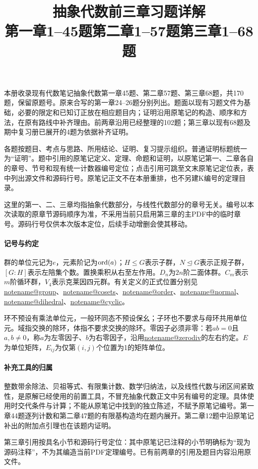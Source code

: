 \documentclass[UTF8,a4paper,11pt,fontset=windows]{ctexart}
\title{抽象代数前三章习题详解\\\large 第一章1--45题\quad 第二章1--57题\quad 第三章1--68题}
\author{}\date{}
\makeatletter
\newcommand{\noteref}[1]{\hyperref[note:#1]{\csname notename@#1\endcsname}}
\makeatother
\begin{document}
\maketitle
本册收录现有代数笔记抽象代数第一章45题、第二章57题、第三章68题，共170题，保留原题号。原来合写的第一章24--26题分别列出。题面以现有习题文件为基础，必要的限定和已知订正放在相应题目内；证明沿用原笔记的构造、顺序和方法，在原有路线中补齐理由。前两章沿用已经整理的102题；第三章以现有68题及期中复习册已展开的4题为依据补齐证明。

各题按题目、考点与思路、所用结论、证明、复习提示组织。普通证明标题统一为“证明”。题中引用的原笔记定义、定理、命题和证明，以原笔记第一、二章各自的章号、节号和现有统一计数器编号定位；点击引用可跳至文末原笔记定位表，表中列出源文件和源码行号。原笔记正文不在本册重排，也不另建K编号的定理目录。

这里的第一、二、三章均指抽象代数部分，与线性代数部分的章号无关。编号以本次读取的原章节源码顺序为准，不采用当前只启用第三章的主PDF中的临时章号。源码行号仅供本次版本定位，后续手动增删会使其移动。

\paragraph{记号与约定}
群的单位元记为$e$，元素阶记为$\operatorname{ord}(a)$；$H\leq G$表示子群，$N\trianglelefteq G$表示正规子群，$[G:H]$表示左陪集个数。置换乘积从右至左作用。$D_n$为$2n$阶二面体群。$C_m$表示$m$阶循环群，$V_4$表示克莱因四元群。有关定义的正式位置分别见\noteref{group}、\noteref{cosets}、\noteref{order}、\noteref{normal}、\noteref{dihedral}、\noteref{cyclic}。

环不预设有乘法单位元，一般环同态不预设保幺；子环也不要求与母环共用单位元。域指交换的除环，体指不要求交换的除环。零因子必须非零：若$ab=0$且$a,b\ne0$，称$a$为左零因子、$b$为右零因子，沿用\noteref{zerodiv}的左右约定。$E$为单位矩阵，$E_{ij}$为仅第$(i,j)$个位置为1的矩阵单位。

\paragraph{补充工具的归属}
整数带余除法、贝祖等式、有限集计数、数学归纳法，以及线性代数与闭区间紧致性，是原解已经使用的前置工具，不冒充抽象代数正文中另有编号的定理。具体使用时交代条件与计算；不能从原笔记中找到的独立陈述，不赋予原笔记编号。第一章44题逐列计数和第二章47题的有限基构造均在题内展开。第二章12题中沿原笔记补出的附加点引理也在该题内证明。

第三章引用按具名小节和源码行号定位：其中原笔记已注释的小节明确标为“现为源码注释”，不为其编造当前PDF定理编号。已有前两章的引用及题目内容沿用原文件。
\end{document}
